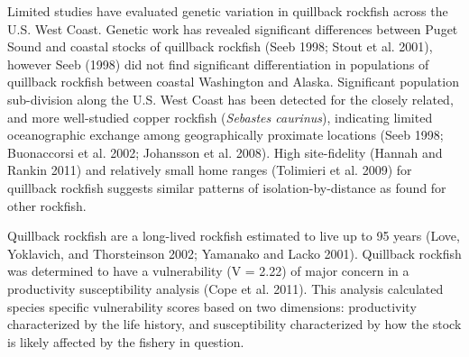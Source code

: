 \documentclass[11pt,
  english,
  a4paper,
]{article}
\begin{document}
\leavevmode\tagmcend\tagstructend\par


Limited studies have evaluated genetic variation in quillback rockfish across the U.S. West Coast. Genetic work has revealed significant differences between Puget Sound and coastal stocks of quillback rockfish {(Seeb 1998; Stout et al. 2001)\leavevmode\tagmcend\tagstructend}, however Seeb {(1998)\leavevmode\tagmcend\tagstructend} did not find significant differentiation in populations of quillback rockfish between coastal Washington and Alaska. Significant population sub-division along the U.S. West Coast has been detected for the closely related, and more well-studied copper rockfish (\emph{Sebastes caurinus}), indicating limited oceanographic exchange among geographically proximate locations {(Seeb 1998; Buonaccorsi et al. 2002; Johansson et al. 2008)\leavevmode\tagmcend\tagstructend}. High site-fidelity {(Hannah and Rankin 2011)\leavevmode\tagmcend\tagstructend} and relatively small home ranges {(Tolimieri et al. 2009)\leavevmode\tagmcend\tagstructend} for quillback rockfish suggests similar patterns of isolation-by-distance as found for other rockfish.

\leavevmode\tagmcend\tagstructend\par


Quillback rockfish are a long-lived rockfish estimated to live up to 95 years {(Love, Yoklavich, and Thorsteinson 2002; Yamanako and Lacko 2001)\leavevmode\tagmcend\tagstructend}. Quillback rockfish was determined to have a vulnerability (V = 2.22) of major concern in a productivity susceptibility analysis {(Cope et al. 2011)\leavevmode\tagmcend\tagstructend}. This analysis calculated species specific vulnerability scores based on two dimensions: productivity characterized by the life history, and susceptibility characterized by how the stock is likely affected by the fishery in question.

\leavevmode\tagmcend\tagstructend\par
\end{document}
